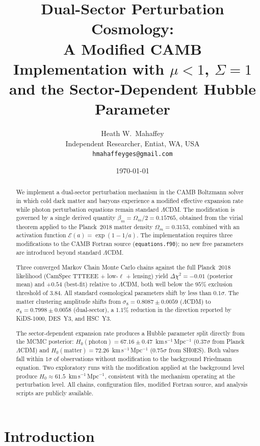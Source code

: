 \documentclass[11pt]{article}
\title{Dual-Sector Perturbation Cosmology:\\
A Modified CAMB Implementation with $\mu < 1$, $\Sigma = 1$\\
and the Sector-Dependent Hubble Parameter}
\author{Heath W.\ Mahaffey\\
Independent Researcher, Entiat, WA, USA\\
\texttt{hmahaffeyges@gmail.com}}
\date{\today}
\begin{document}
\maketitle

\begin{abstract}
We implement a dual-sector perturbation mechanism in the CAMB Boltzmann
solver in which cold dark matter and baryons experience a modified
effective expansion rate while photon perturbation equations remain
standard $\Lambda$CDM.  The modification is governed by a single derived
quantity $\beta_m = \Omega_m/2 = 0.15765$, obtained from the virial
theorem applied to the Planck~2018 matter density $\Omega_m = 0.3153$,
combined with an activation function $\mathcal{E}(a) = \exp(1 - 1/a)$.
The implementation requires three modifications to the CAMB Fortran
source (\texttt{equations.f90}); no new free parameters are introduced
beyond standard $\Lambda$CDM.

Three converged Markov Chain Monte Carlo chains against the full
Planck~2018 likelihood (CamSpec TTTEEE + low-$\ell$ + lensing) yield
$\Delta\chi^2 = -0.01$ (posterior mean) and $+0.54$ (best-fit) relative
to $\Lambda$CDM, both well below the $95\%$ exclusion threshold of
$3.84$.  All standard cosmological parameters shift by less than
$0.1\sigma$.  The
matter clustering amplitude shifts from
$\sigma_8 = 0.8087 \pm 0.0059$ ($\Lambda$CDM) to
$\sigma_8 = 0.7998 \pm 0.0058$ (dual-sector), a $1.1\%$ reduction in
the direction reported by KiDS-1000, DES~Y3, and HSC~Y3.

The sector-dependent expansion rate produces a Hubble parameter split
directly from the MCMC posterior:
$H_0(\mathrm{photon}) = 67.16 \pm 0.47$~km\,s$^{-1}$\,Mpc$^{-1}$
($0.37\sigma$ from Planck $\Lambda$CDM) and
$H_0(\mathrm{matter}) = 72.26$~km\,s$^{-1}$\,Mpc$^{-1}$
($0.75\sigma$ from SH0ES).  Both values fall within
$1\sigma$ of observations without modification to the background Friedmann equation.
Two exploratory runs with the modification applied at the background
level produce $H_0 \approx 61.5$~km\,s$^{-1}$\,Mpc$^{-1}$,
consistent with the mechanism operating at the perturbation
level.  All chains, configuration files, modified Fortran source, and
analysis scripts are publicly available.
\end{abstract}


\section{Introduction}
\label{sec:intro}
\end{document}
